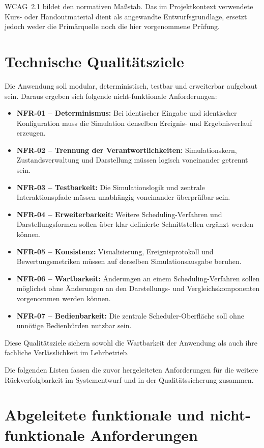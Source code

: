 WCAG~2.1 bildet den normativen Maßstab. Das im Projektkontext verwendete Kurs- oder Handoutmaterial dient als angewandte Entwurfsgrundlage, ersetzt jedoch weder die Primärquelle noch die hier vorgenommene Prüfung.

\section{Technische Qualitätsziele}

Die Anwendung soll modular, deterministisch, testbar und erweiterbar aufgebaut sein. Daraus ergeben sich folgende nicht-funktionale Anforderungen:

\begin{itemize}
    \item \textbf{NFR-01 -- Determinismus:} Bei identischer Eingabe und identischer Konfiguration muss die Simulation denselben Ereignis- und Ergebnisverlauf erzeugen.
    \item \textbf{NFR-02 -- Trennung der Verantwortlichkeiten:} Simulationskern, Zustandsverwaltung und Darstellung müssen logisch voneinander getrennt sein.
    \item \textbf{NFR-03 -- Testbarkeit:} Die Simulationslogik und zentrale Interaktionspfade müssen unabhängig voneinander überprüfbar sein.
    \item \textbf{NFR-04 -- Erweiterbarkeit:} Weitere Scheduling-Verfahren und Darstellungsformen sollen über klar definierte Schnittstellen ergänzt werden können.
    \item \textbf{NFR-05 -- Konsistenz:} Visualisierung, Ereignisprotokoll und Bewertungsmetriken müssen auf derselben Simulationsausgabe beruhen.
    \item \textbf{NFR-06 -- Wartbarkeit:} Änderungen an einem Scheduling-Verfahren sollen möglichst ohne Änderungen an den Darstellungs- und Vergleichskomponenten vorgenommen werden können.
    \item \textbf{NFR-07 -- Bedienbarkeit:} Die zentrale Scheduler-Oberfläche soll ohne unnötige Bedienhürden nutzbar sein.
\end{itemize}

Diese Qualitätsziele sichern sowohl die Wartbarkeit der Anwendung als auch ihre fachliche Verlässlichkeit im Lehrbetrieb.

Die folgenden Listen fassen die zuvor hergeleiteten Anforderungen für die weitere Rückverfolgbarkeit im Systementwurf und in der Qualitätssicherung zusammen.

\section{Abgeleitete funktionale und nicht-funktionale Anforderungen}

